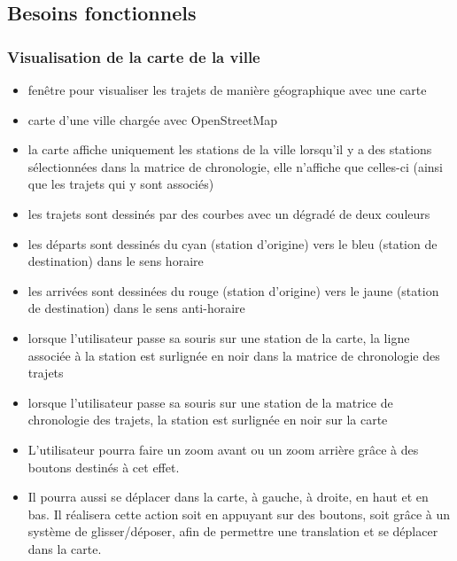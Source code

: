 \documentclass[12pt]{article}
\begin{document}
		\subsection{Besoins fonctionnels}
			\subsubsection{Visualisation de la carte de la ville}
				\begin{itemize}
					\item fenêtre pour visualiser les trajets de manière géographique avec une carte
					\item carte d'une ville chargée avec OpenStreetMap
					\item la carte affiche uniquement les stations de la ville lorsqu'il y a des stations sélectionnées dans la matrice de chronologie, elle n'affiche que celles-ci (ainsi que les trajets qui y sont associés)
					\item les trajets sont dessinés par des courbes avec un dégradé de deux couleurs
					\item les départs sont dessinés du cyan (station d'origine) vers le bleu (station de destination) dans le sens horaire
					\item les arrivées sont dessinées du rouge (station d'origine) vers le jaune (station de destination) dans le sens anti-horaire
					\item lorsque l'utilisateur passe sa souris sur une station de la carte, la ligne associée à la station est surlignée en noir dans la matrice de chronologie des trajets
					\item lorsque l'utilisateur passe sa souris sur une station de la matrice de chronologie des trajets, la station est surlignée en noir sur la carte
					\item L'utilisateur pourra faire un zoom avant ou un zoom arrière grâce à des boutons destinés à cet effet.
					\item Il pourra aussi se déplacer dans la carte, à gauche, à droite, en haut et en bas. Il réalisera cette action soit en appuyant sur des boutons, soit grâce à un système de glisser/déposer, afin de permettre une translation et se déplacer dans la carte.
				\end{itemize}
\end{document}
